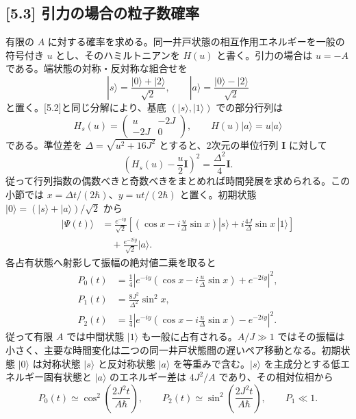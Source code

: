 \documentclass[11pt,a4paper]{article}
\begin{document}
\subsection*{[5.3] 引力の場合の粒子数確率}
有限の $A$ に対する確率を求める。同一井戸状態の相互作用エネルギーを一般の符号付き $u$ とし、そのハミルトニアンを $H(u)$ と書く。引力の場合は $u=-A$ である。端状態の対称・反対称な組合せを
\begin{equation}
 |s\rangle=\frac{|0\rangle+|2\rangle}{\sqrt2},\qquad
 |a\rangle=\frac{|0\rangle-|2\rangle}{\sqrt2}
\end{equation}
と置く。[5.2]と同じ分解により、基底 $(|s\rangle,|1\rangle)$ での部分行列は
\begin{equation}
 H_s(u)=\begin{pmatrix}u&-2J\\-2J&0\end{pmatrix},
 \qquad H(u)|a\rangle=u|a\rangle
\end{equation}
である。準位差を $\Delta=\sqrt{u^2+16J^2}$ とすると、2次元の単位行列 $\mathbf I$ に対して
\begin{equation}
 \left(H_s(u)-\frac u2\mathbf I\right)^2
 =\frac{\Delta^2}{4}\mathbf I.
\end{equation}
従って行列指数の偶数べきと奇数べきをまとめれば時間発展を求められる。この小節では $x=\Delta t/(2\hbar)$、$y=ut/(2\hbar)$ と置く。初期状態 $|0\rangle=(|s\rangle+|a\rangle)/\sqrt2$ から
\begin{align}
 |\Psi(t)\rangle
 &=\frac{e^{-iy}}{\sqrt2}
   \left[\left(\cos x-i\frac u\Delta\sin x\right)|s\rangle
          +i\frac{4J}{\Delta}\sin x\,|1\rangle\right]\\
 &\quad+\frac{e^{-2iy}}{\sqrt2}|a\rangle.
\end{align}
各占有状態へ射影して振幅の絶対値二乗を取ると
\begin{align}
 P_0(t)&=\frac14\left|e^{-iy}\left(\cos x-i\frac u\Delta\sin x\right)+e^{-2iy}\right|^2,\\
 P_1(t)&=\frac{8J^2}{\Delta^2}\sin^2x,\\
 P_2(t)&=\frac14\left|e^{-iy}\left(\cos x-i\frac u\Delta\sin x\right)-e^{-2iy}\right|^2.
\end{align}
従って有限 $A$ では中間状態 $|1\rangle$ も一般に占有される。$A/J\gg1$ ではその振幅は小さく、主要な時間変化は二つの同一井戸状態間の遅いペア移動となる。初期状態 $|0\rangle$ は対称状態 $|s\rangle$ と反対称状態 $|a\rangle$ を等重みで含む。$|s\rangle$ を主成分とする低エネルギー固有状態と $|a\rangle$ のエネルギー差は $4J^2/A$ であり、その相対位相から
\begin{equation}
 P_0(t)\simeq\cos^2\!\left(\frac{2J^2t}{A\hbar}\right),\qquad
 P_2(t)\simeq\sin^2\!\left(\frac{2J^2t}{A\hbar}\right),\qquad P_1\ll1.
\end{equation}
\end{document}
